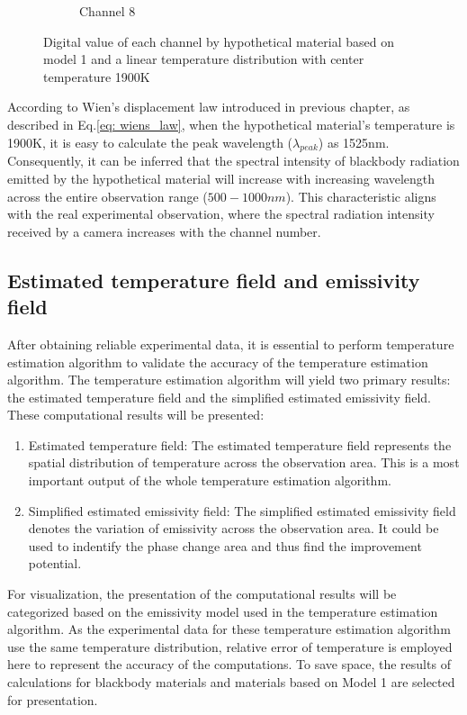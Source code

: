\begin{figure}[htbp]
\begin{minipage}{0.87\textwidth}
\begin{subfigure}{0.23\textwidth}
            \caption{Channel 8}
        \end{subfigure}
    \end{minipage}
    \caption{Digital value of each channel by hypothetical material based on model 1
    and a linear temperature distribution with center temperature 1900K}
    \label{fig: channel}
\end{figure}


According to Wien's displacement law introduced in previous chapter, 
as described in Eq.\ref{eq: wiens_law}, when the hypothetical material's 
temperature is 1900K, it is easy to calculate the peak 
wavelength ($\lambda_{peak}$) as 1525nm. Consequently, it can be 
inferred that the spectral intensity of blackbody radiation emitted 
by the hypothetical material will increase with increasing wavelength 
across the entire observation range ($500-1000nm$). This characteristic 
aligns with the real experimental observation, where the spectral 
radiation intensity received by a camera increases with the channel 
number.

\subsection{Estimated temperature field and emissivity field}
After obtaining reliable experimental data, it is essential to perform 
temperature estimation algorithm to validate the accuracy of the 
temperature estimation algorithm. The temperature estimation algorithm 
will yield two primary results: the estimated temperature field and the 
simplified estimated emissivity field. These computational results 
will be presented:

\begin{enumerate}
    \item Estimated temperature field: The estimated temperature field represents 
    the spatial distribution of temperature across the observation area. This is 
    a most important output of the whole temperature estimation algorithm.

    \item Simplified estimated emissivity field: The simplified estimated 
    emissivity field denotes the variation of emissivity across the 
    observation area. It could be used to indentify the phase change area 
    and thus find the improvement potential.
\end{enumerate}


For visualization, the presentation of the computational results will be categorized based on the 
emissivity model used in the temperature estimation algorithm. As the 
experimental data for these temperature estimation algorithm use the 
same temperature distribution, relative error of temperature is employed here to 
represent the accuracy of the computations. To save space, the results 
of calculations for blackbody materials and materials based on Model 1 are selected for presentation.


